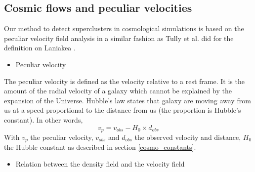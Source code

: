 \documentclass[12pt]{article}
\begin{document}
\subsection{Cosmic flows and peculiar velocities}
\label{sec:peculiar_vel}
Our method to detect superclusters in cosmological
 simulations is based on the peculiar velocity field
  analysis in a similar fashion as Tully et al. did for
   the definition on Laniakea \cite{tully_laniakea_2014}
    \cite{tempel_cosmology:_2014}.
\begin{itemize}
\item Peculiar velocity
\end{itemize}
\begin{par}
The peculiar velocity is defined as the velocity relative to a rest frame. It is the amount of the radial velocity of a galaxy which cannot be explained by the expansion of the Universe. Hubble's law states that galaxy are moving away from us at a speed proportional to the distance from us (the proportion is Hubble's constant). In other words,
\[ 
v_p = v_{obs} - H_{0} \times d_{obs}
\]
With $v_p$ the peculiar velocity, $v_{obs}$ and $d_{obs}$ the observed velocity and distance, $H_{0}$ the Hubble constant as described in section \ref{cosmo_constants}.
\end{par}

\begin{itemize}
\item Relation between the density field and the velocity field
\end{itemize}
\end{document}
